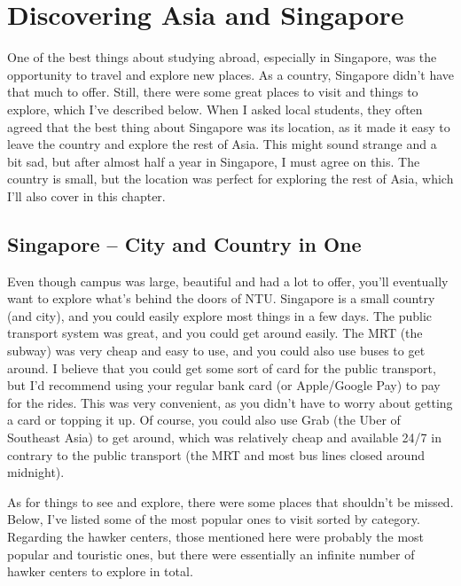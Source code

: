 \chapter*{Discovering Asia and Singapore}
\label{discover}
\vspace{-0.15cm}
One of the best things about studying abroad, especially in Singapore, was the opportunity to travel and explore new places. As a country, Singapore didn't have that much to offer. Still, there were some great places to visit and things to explore, which I've described below. When I asked local students, they often agreed that the best thing about Singapore was its location, as it made it easy to leave the country and explore the rest of Asia. This might sound strange and a bit sad, but after almost half a year in Singapore, I must agree on this. The country is small, but the location was perfect for exploring the rest of Asia, which I'll also cover in this chapter.
\vspace{-0.15cm}
\section*{Singapore -- City and Country in One}
{}
\vspace{-0.1cm}
Even though campus was large, beautiful and had a lot to offer, you'll eventually want to explore what's behind the doors of NTU. Singapore is a small country (and city), and you could easily explore most things in a few days. The public transport system was great, and you could get around easily. The MRT (the subway) was very cheap and easy to use, and you could also use buses to get around. I believe that you could get some sort of card for the public transport, but I'd recommend using your regular bank card (or Apple/Google Pay) to pay for the rides. This was very convenient, as you didn't have to worry about getting a card or topping it up. Of course, you could also use Grab (the Uber of Southeast Asia) to get around, which was relatively cheap and available 24/7 in contrary to the public transport (the MRT and most bus lines closed around midnight).

As for things to see and explore, there were some places that shouldn't be missed. Below, I've listed some of the most popular ones to visit sorted by category. Regarding the hawker centers, those mentioned here were probably the most popular and touristic ones, but there were essentially an infinite number of hawker centers to explore in total.

